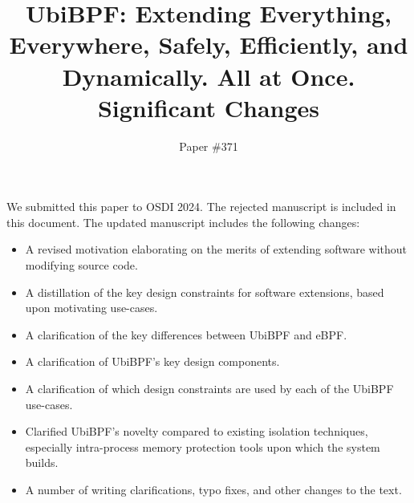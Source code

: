 \documentclass[11pt]{article}
\title{UbiBPF: Extending Everything, Everywhere, Safely, Efficiently, and Dynamically. All at Once.\\
Significant Changes}
\author{Paper \#371}
\date{}
\begin{document}
\maketitle

We submitted this paper to OSDI 2024. The rejected manuscript is included in this document.  The updated manuscript includes the following changes:

\begin{itemize}
    \item A revised motivation elaborating on the merits of extending software without modifying source code.
    \item A distillation of the key design constraints for software extensions, based upon motivating use-cases.
    \item A clarification of the key differences between UbiBPF and eBPF. 
    \item A clarification of UbiBPF's key design components.
    \item A clarification of which design constraints are used by each of the UbiBPF use-cases.
    \item Clarified UbiBPF's novelty compared to existing isolation techniques, especially intra-process memory protection tools upon which the system builds.
    \item A number of writing clarifications, typo fixes, and other changes to the text.
\end{itemize}
\end{document}
